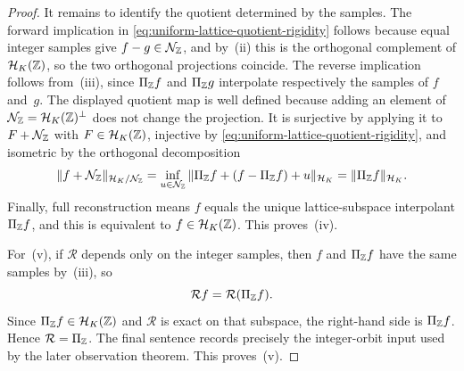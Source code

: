 \begin{proof}
It remains to identify the quotient determined by the samples.  The forward
implication in \eqref{eq:uniform-lattice-quotient-rigidity} follows because
equal integer samples give $f-g\in\mathcal N_{\mathbb{Z}}$, and by~(ii) this is the
orthogonal complement of $\mathcal H_K(\mathbb{Z})$, so the two orthogonal
projections coincide.  The reverse implication follows from~(iii), since
$\Pi_{\mathbb{Z}}f$ and $\Pi_{\mathbb{Z}}g$ interpolate respectively the samples of
$f$ and~$g$.
The displayed quotient map is well defined because adding an element of
$\mathcal N_{\mathbb{Z}}=\mathcal H_K(\mathbb{Z})^\perp$ does not change the projection.  It is
surjective by applying it to $F+\mathcal N_{\mathbb{Z}}$ with $F\in\mathcal H_K(\mathbb{Z})$,
injective by \eqref{eq:uniform-lattice-quotient-rigidity}, and isometric by
the orthogonal decomposition
\[
\|f+\mathcal N_{\mathbb{Z}}\|_{\mathcal H_K/\mathcal N_{\mathbb{Z}}}
=\inf_{u\in\mathcal N_{\mathbb{Z}}}
\|\Pi_{\mathbb{Z}}f+(f-\Pi_{\mathbb{Z}}f)+u\|_{\mathcal H_K}
=\|\Pi_{\mathbb{Z}}f\|_{\mathcal H_K}.
\]
Finally, full reconstruction means $f$ equals the unique lattice-subspace
interpolant $\Pi_{\mathbb{Z}}f$, and this is equivalent to
$f\in\mathcal H_K(\mathbb{Z})$.  This proves~(iv).

For~(v), if $\mathcal R$ depends only on the integer samples, then $f$ and
$\Pi_{\mathbb{Z}}f$ have the same samples by~(iii), so
\[
\mathcal Rf=\mathcal R(\Pi_{\mathbb{Z}}f).
\]
Since $\Pi_{\mathbb{Z}}f\in\mathcal H_K(\mathbb{Z})$ and $\mathcal R$ is exact on that
subspace, the right-hand side is $\Pi_{\mathbb{Z}}f$.  Hence
$\mathcal R=\Pi_{\mathbb{Z}}$.  The final sentence records precisely the
integer-orbit input used by the later observation theorem.
This proves~(v).
\end{proof}

